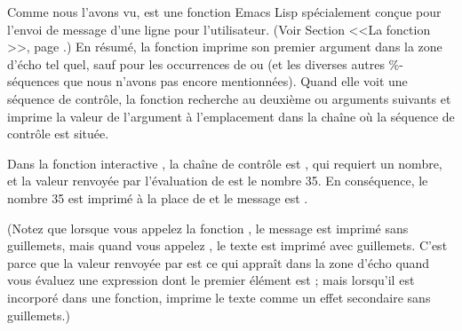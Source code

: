 Comme nous l'avons vu,  est une fonction Emacs Lisp
spécialement conçue pour l'envoi de message d'une ligne pour
l'utilisateur. (Voir Section  <<La fonction
>>, page .) En résumé, la fonction
 imprime son premier argument dans la zone d'écho tel
quel, sauf pour les occurrences de  ou  (et les
diverses autres \%-séquences que nous n'avons pas encore
mentionnées). Quand elle voit une séquence de contrôle, la fonction
recherche au deuxième ou arguments suivants et imprime la valeur de
l'argument à l'emplacement dans la chaîne où la séquence de contrôle
est située. 

Dans la fonction interactive , la chaîne de
contrôle est , qui requiert un nombre, et la valeur renvoyée
par l'évaluation de  est le nombre 35. En conséquence, le
nombre 35 est imprimé à la place de  et le message est
.

(Notez que lorsque vous appelez la fonction , le
message est imprimé sans guillemets, mais quand vous appelez
, le texte est imprimé avec guillemets. C'est parce que la
valeur renvoyée par  est ce qui appraît dans la zone
d'écho quand vous évaluez une expression dont le premier élément est
; mais lorsqu'il est incorporé dans une fonction,
 imprime le texte comme un effet secondaire sans guillemets.)